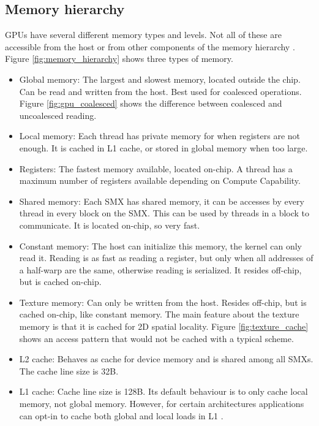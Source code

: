 \documentclass[../main/thesis.tex]{subfiles}
\begin{document}




\subsection{Memory hierarchy}
GPUs have several different memory types and levels.
Not all of these are accessible from the host or from other components of the memory hierarchy \cite{cuda}. Figure \ref{fig:memory_hierarchy} shows three types of memory.
\begin{itemize}
\item Global memory: The largest and slowest memory, located outside the chip. Can be read and written from the host. Best used for coalesced operations. Figure \ref{fig:gpu_coalesced} shows the difference between coalesced and uncoalesced reading.
\item Local memory: Each thread has private memory for when registers are not enough. It is cached in L1 cache, or stored in global memory when too large.
\item Registers: The fastest memory available, located on-chip. A thread has a maximum number of registers available depending on Compute Capability.
\item Shared memory: Each SMX has shared memory, it can be accesses by every thread in every block on the SMX. This can be used by threads in a block to communicate. It is located on-chip, so very fast.
\item Constant memory: The host can initialize this memory, the kernel can only read it. Reading is as fast as reading a register, but only when all addresses of a half-warp are the same, otherwise reading is serialized. It resides off-chip, but is cached on-chip.
\item Texture memory: Can only be written from the host. Resides off-chip, but is cached on-chip, like constant memory. The main feature about the texture memory is that it is cached for 2D spatial locality. Figure \ref{fig:texture_cache} shows an access pattern that would not be cached with a typical scheme.
\item L2 cache: Behaves as cache for device memory and is shared among all SMXs. The cache line size is 32B.
\item L1 cache: Cache line size is 128B. Its default behaviour is to only cache local memory, not global memory. However, for certain architectures applications can opt-in to cache both global and local loads in L1 \cite{L1cache}.
\end{itemize}
\end{document}
